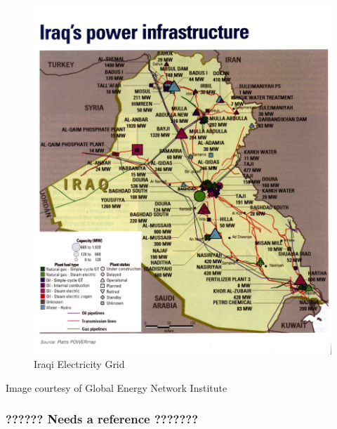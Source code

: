 \documentclass{report}
\begin{document}
\begin{figure}[H]
 \centering
 \includegraphics[trim = 0cm 0cm 0cm 0cm, clip,scale=.6]{./figures/elec_grid.jpg}
   \caption{Iraqi Electricity Grid}
     \label{fig:elec_grid}
\end{figure}



Image courtesy of Global Energy Network Institute



\subsubsection{??????  Needs a reference   ???????}
\end{document}
